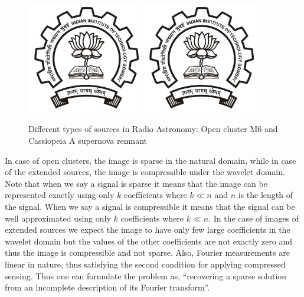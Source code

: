  \begin{figure}[htp]
	\centering \vspace{-0.1in}
	\includegraphics[width=0.45\textwidth]{images/openC.jpg}	\hfill
	\includegraphics[width=0.45\textwidth]{images/casA.jpg}	
	 \caption[Different types of sources in Radio Astronomy]{\small Different types of sources in Radio Astronomy: Open cluster M$6$ and Cassiopeia A supernova remnant}
	\label{fig:casAopenC}
\end{figure}

In case of open clusters, the image is sparse in the natural domain, while in case of the extended sources,
the image is compressible under the wavelet domain. Note that when we say a signal is sparse it means that the image can be represented exactly using only $k$ coefficients where $k \ll n$ and $n$ is the length of the signal. When we say a signal is compressible it means that the signal can be well approximated using only $k$ coefficients where $k \ll n$. In the case of images of extended sources we expect the image to have only few large coefficients in the wavelet domain but the values of the other coefficients are not exactly zero and thus the image is compressible and not sparse.
Also, Fourier measurements are linear in nature, thus satisfying the 
second condition for applying compressed sensing. Thus one can formulate the problem as, ``recovering a sparse solution from an incomplete
description of its Fourier transform''.


